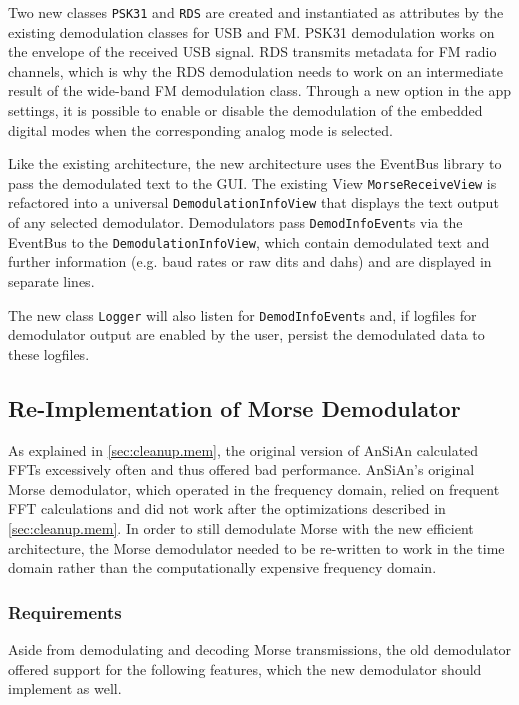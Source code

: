 Two new classes \texttt{PSK31} and \texttt{RDS} are created and instantiated as attributes by the existing demodulation classes for \ac{USB} and \ac{FM}. \ac{PSK31} demodulation
works on the envelope of the received \ac{USB} signal. \ac{RDS} transmits
metadata for \ac{FM} radio channels, which is why the \ac{RDS} demodulation
needs to work on an intermediate result of the wide-band \ac{FM} demodulation
class. Through a new option in the app settings, it is possible to enable
or disable the demodulation of the embedded digital modes when the
corresponding analog mode is selected.

Like the existing architecture, the new architecture uses the EventBus
library to pass the demodulated text to the \ac{GUI}. The existing View
\texttt{MorseReceiveView} is refactored into a universal
\texttt{De\-mo\-du\-la\-tion\-In\-fo\-View} that displays the text output of any selected 
demodulator. Demodulators pass
\texttt{DemodInfoEvent}s via the EventBus to the \texttt{De\-mo\-du\-la\-tion\-In\-fo\-View}, 
which contain demodulated text and further information (e.g. baud rates or raw 
dits and dahs) and are displayed in separate lines.

The new class \texttt{Logger} will also listen for \texttt{DemodInfoEvent}s and, if logfiles for demodulator output are enabled by the user, persist the demodulated data to these logfiles.

\subsection{Re-Implementation of Morse Demodulator\label{sec:morse_demod}}

As explained in \autoref{sec:cleanup.mem}, the original version of \ac{AnSiAn} calculated \acp{FFT} excessively often and thus offered bad performance. \ac{AnSiAn}'s original Morse demodulator, which operated in the frequency domain, relied on frequent \ac{FFT} calculations and did not work after the optimizations described in \autoref{sec:cleanup.mem}. In order to still demodulate Morse with the new efficient architecture, the Morse demodulator needed to be re-written to work in the time domain rather than the computationally expensive frequency domain.

\subsubsection{Requirements}

Aside from demodulating and decoding Morse transmissions, the old demodulator offered support for the following features, which the new demodulator should implement as well.

